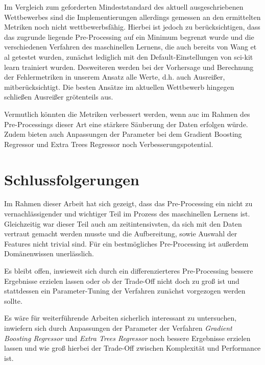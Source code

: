 \documentclass{svproc}
\begin{document}
Im Vergleich zum geforderten Mindeststandard des aktuell ausgeschriebenen Wettbewerbes sind die Implementierungen allerdings gemessen an den ermittelten Metriken noch nicht wettbewerbsfähig. Hierbei ist jedoch zu berücksichtigen, dass das zugrunde liegende Pre-Processing auf ein Minimum begrenzt wurde und die verschiedenen Verfahren des maschinellen Lernens, die auch bereits von Wang et al \cite{Wang2020} getestet wurden, zunächst lediglich mit den Default-Einstellungen von sci-kit learn trainiert wurden. Desweiteren werden bei der Vorhersage und Berechnung der Fehlermetriken in unserem Ansatz alle Werte, d.h. auch Ausreißer, mitberücksichtigt. Die besten Ansätze im aktuellen Wettbewerb hingegen schließen Ausreißer grötenteils aus.

Vermutlich könnten die Metriken verbessert werden, wenn auc im Rahmen des Pre-Processings dieser Art eine stärkere Säuberung der Daten erfolgen würde. Zudem bieten auch Anpassungen der Parameter bei dem Gradient Boosting Regressor und Extra Trees Regressor noch Verbesserungspotential.

%
%
%
\section{Schlussfolgerungen}
%
Im Rahmen dieser Arbeit hat sich gezeigt, dass das Pre-Processing ein nicht zu vernachlässigender und wichtiger Teil im Prozess des maschinellen Lernens ist. Gleichzeitig war dieser Teil auch am zeitintensivsten, da sich mit den Daten vertraut gemacht werden musste und die Aufbereitung, sowie Auswahl der Features nicht trivial sind. Für ein bestmögliches Pre-Processing ist außerdem Domänenwissen unerlässlich.

Es bleibt offen, inwieweit sich durch ein differenzierteres Pre-Processing bessere Ergebnisse erzielen lassen oder ob der Trade-Off nicht doch zu groß ist und stattdessen ein Parameter-Tuning der Verfahren zunächst vorgezogen werden sollte.

Es wäre für weiterführende Arbeiten sicherlich interessant zu untersuchen, inwiefern sich durch Anpassungen der Parameter der Verfahren \textit{Gradient Boosting Regressor} und \textit{Extra Trees Regressor} noch bessere Ergebnisse erzielen lassen und wie groß hierbei der Trade-Off zwischen Komplexität und Performance ist.

%
%
%


\end{document}
